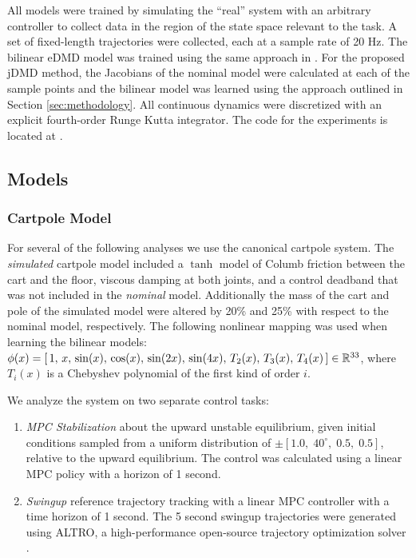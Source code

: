 \documentclass{article}
\begin{document}
All models were trained by simulating the ``real'' system with an arbitrary controller to 
collect data in the region of the state space relevant to the task. A set of fixed-length 
trajectories were collected, each at a sample rate of 20 Hz. The bilinear eDMD model was
trained using the same approach in \cite{Folkestad2021}. For the proposed jDMD method, the
Jacobians of the nominal model were calculated at each of the sample points and the bilinear
model was learned using the approach outlined in Section \ref{sec:methodology}.
All continuous dynamics were discretized with an explicit fourth-order Runge Kutta 
integrator. The code for the experiments is located at .

\subsection{Models}
\subsubsection{Cartpole Model}

For several of the following analyses we use the canonical cartpole system.  The
\textit{simulated} cartpole model included a $\tanh$ model of Columb friction between the
cart and the floor, viscous damping at both joints, and a control deadband that was not
included in the \textit{nominal} model. Additionally the mass of the cart and pole of the
simulated model were altered by 20\% and 25\% with respect to the nominal model,
respectively.  The following nonlinear mapping was used when learning the bilinear models: 
$\phi(x) = [\, 1,\, x,\, \sin(x),\, \cos(x),\, \sin(2x),\, \sin(4x),\, T_2(x),\, T_3(x),\,
T_4(x)\, ] \in \mathbb{R}^{33}$, where $T_i(x)$ is a Chebyshev polynomial of the first kind of order
$i$.

We analyze the system on two separate control tasks: 
\begin{enumerate}
  \item \textit{MPC Stabilization} about the upward unstable equilibrium, given initial
  conditions sampled from a uniform distribution of $\pm[1.0,\; 40^\circ,\; 0.5,\; 0.5]$,
  relative to the upward equilibrium. The control was calculated using a linear MPC policy
  with a horizon of 1 second.
  
  \item \textit{Swingup} reference trajectory tracking with a linear MPC controller with a 
  time horizon of 1 second. The 5 second swingup trajectories were generated using ALTRO, a 
  high-performance open-source trajectory optimization solver \cite{Howell2019,Jackson2021}.
\end{enumerate}
\end{document}
